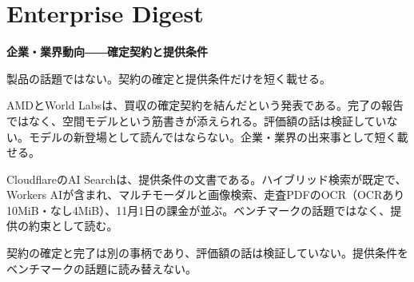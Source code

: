 \section{Enterprise Digest}
\begin{wideflow}
{\Large\bfseries 企業・業界動向――確定契約と提供条件}\par
\smallskip
{\color{SurveyMuted}製品の話題ではない。契約の確定と提供条件だけを短く載せる。}\par
\end{wideflow}

AMDとWorld Labsは、買収の確定契約を結んだという発表である\cite{worldlabs}。完了の報告ではなく、空間モデルという筋書きが添えられる。評価額の話は検証していない。モデルの新登場として読んではならない。企業・業界の出来事として短く載せる。

CloudflareのAI Searchは、提供条件の文書である\cite{aisearch}。ハイブリッド検索が既定で、Workers AIが含まれ、マルチモーダルと画像検索、走査PDFのOCR（OCRあり10MiB・なし4MiB）、11月1日の課金が並ぶ。ベンチマークの話題ではなく、提供の約束として読む。

\begin{claimboundary}[資料と評価の境界]
契約の確定と完了は別の事柄であり、評価額の話は検証していない。提供条件をベンチマークの話題に読み替えない。
\end{claimboundary}
